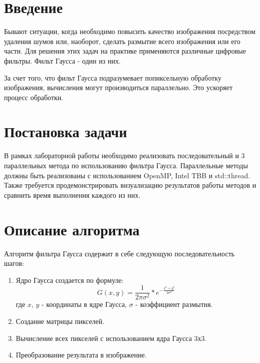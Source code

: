 \documentclass{report}
\begin{document}
\setcounter{page}{2}
\tableofcontents
\newpage

\section*{Введение}
\par Бывают ситуации, когда необходимо повысить качество изображения посредством удаления шумов или, наоборот, сделать размытие всего изображения или его части. Для решения этих задач на практике применяются различные цифровые фильтры. Фильт Гаусса - один из них.
\par За счет того, что фильт Гаусса подразумевает попиксельную обработку изображения, вычисления могут производиться параллельно. Это ускоряет процесс обработки.
\newpage

\section*{Постановка задачи}
\par В рамках лабораторной работы необходимо реализовать последовательный и 3 параллельных метода по использованию фильтра Гаусса. Параллельные методы должны быть реализованы с использованием OpenMP, Intel TBB и std::thread. Также требуется продемонстрировать визуализацию результатов работы методов и сравнить время выполнения каждого из них.
\newpage

\section*{Описание алгоритма}
\par Алгоритм фильтра Гаусса содержит в себе следующую последовательность шагов:
\begin{enumerate}
\item Ядро Гаусса создается по формуле: {\LARGE $$G(x,y) = \frac{1}{2\pi\sigma^2} * e^{-\frac{x^2 + y^2}{2\sigma^2}}$$ }
где $x$, $y$ - координаты в ядре Гаусса, $\sigma$ - коэффициент размытия.
\item Создание матрицы пикселей.
\item Вычисление всех пикселей с использованием ядра Гаусса 3х3.
\item Преобразование результата в изображение.
\end{enumerate}
\newpage
\end{document}
